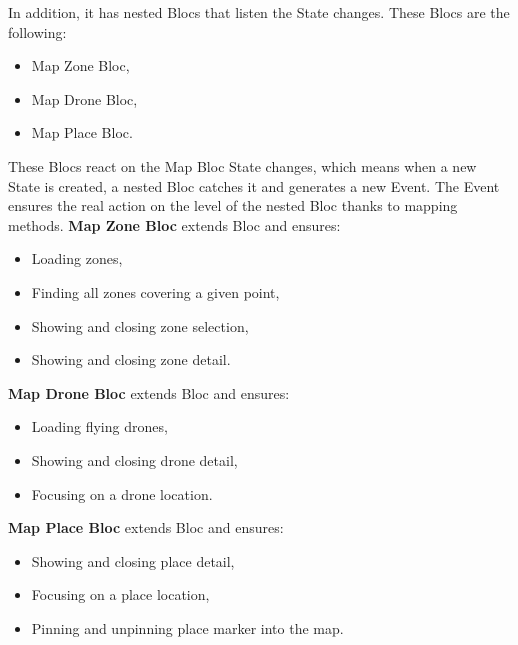\newpage

In addition, it has nested Blocs that listen the State changes.
These Blocs are the following:
\begin{itemize}
    \item Map Zone Bloc,
    \item Map Drone Bloc,
    \item Map Place Bloc.
\end{itemize}
These Blocs react on the Map Bloc State changes, which means when a new State is created, a nested Bloc catches it and generates a new Event.
The Event ensures the real action on the level of the nested Bloc thanks to mapping methods.
\newline
\newline
\textbf{Map Zone Bloc} extends Bloc and ensures:
\begin{itemize}
    \item Loading zones,
    \item Finding all zones covering a given point,
    \item Showing and closing zone selection,
    \item Showing and closing zone detail.
\end{itemize}
\textbf{Map Drone Bloc} extends Bloc and ensures:
\begin{itemize}
    \item Loading flying drones,
    \item Showing and closing drone detail,
    \item Focusing on a drone location.
\end{itemize}
\textbf{Map Place Bloc} extends Bloc and ensures:
\begin{itemize}
    \item Showing and closing place detail,
    \item Focusing on a place location,
    \item Pinning and unpinning place marker into the map.
\end{itemize}
